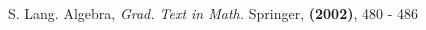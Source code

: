 
\begin{thebibliography}{10}

S. Lang.
Algebra, {\em Grad. Text in Math.}
Springer, \textbf{(2002)}, 480 - 486


\end{thebibliography}
